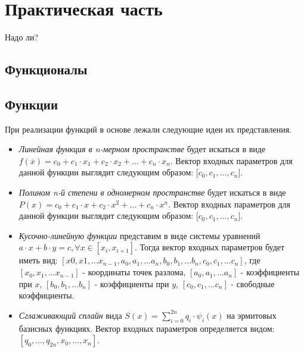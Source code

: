 \chapter{Практическая часть}

Надо ли?

\section{Функционалы}

\section{Функции}

При реализации функций в основе лежали следующие идеи их представления.

\begin{itemize}
		\item \textsl{Линейная функция в n-мерном пространстве} будет искаться в виде $f(\overline{x}) = c_0 + c_1 \cdot x_1 + c_2 \cdot x_2 + ... + c_n \cdot x_n$. Вектор входных параметров для данной функции выглядит следующим образом: [$c_0, c_1, ..., c_n$].
		\item \textsl{Полином n-й степени в одномерном пространстве} будет искаться в виде $P(x) = c_0 + c_1 \cdot x + c_2 \cdot x^2 + ... + c_n \cdot x^n$. Вектор входных параметров для данной функции выглядит следующим образом: [$c_0, c_1, ..., c_n$].
		\item \textsl{Кусочно-линейную функции} представим в виде системы уравнений $a \cdot x + b \cdot y = c, \forall x \in [x_i, x_{i + 1}]$. Тогда вектор входных параметров будет иметь вид: $[x0, x1, ... x_{n - 1}, a_0, a_1, ... a_n, b_0, b_1, ... b_n, c_0, c_1, ... c_n]$, где $[x_0, x_1, ... x_{n-1}]$ - координаты точек разлома, $[a_0, a_1, ... a_n]$ - коэффициенты при $x$, $[b_0, b_1, ... b_n]$ - коэффициенты при $y$, $[c_0, c_1, ... c_n]$ - свободные коэффициенты.
		\item \textsl{Сглаживающий сплайн} вида $S(x) = \sum_{i = 0}^{2n} q_i \cdot \psi_i(x)$ на эрмитовых базисных функциях. Вектор входных параметров определяется видом: $[q_0, ..., q_{2n}, x_0, ..., x_n]$.
	\end{itemize}